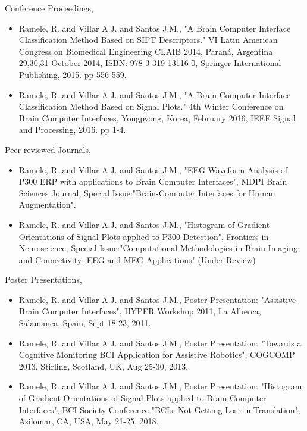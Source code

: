 \documentclass[11pt,twoside,openright]{moddalthesis}
\theoremstyle{definition}
\begin{document}
\begin{listofpubs}

\vspace{-\baselineskip}
\vspace{-\baselineskip}

Conference Proceedings,


\begin{itemize}
\item Ramele, R. and Villar A.J. and Santos J.M., "A Brain Computer Interface Classification Method Based on SIFT Descriptors." VI Latin American Congress on Biomedical Engineering CLAIB 2014, Paraná, Argentina 29,30,31 October 2014,  ISBN: 978-3-319-13116-0, Springer International Publishing, 2015. pp 556-559.
\item Ramele, R. and Villar A.J. and Santos J.M.,  "A Brain Computer Interface Classification Method Based on Signal Plots." 4th Winter Conference on Brain Computer Interfaces, Yongpyong, Korea, February 2016, IEEE Signal and Processing, 2016. pp 1-4.
\end{itemize}

Peer-reviewed Journals,


\begin{itemize}
\item Ramele, R. and Villar A.J. and Santos J.M.,  "EEG Waveform Analysis of P300 ERP with applications to Brain Computer Interfaces", MDPI Brain Sciences Journal, Special Issue:"Brain-Computer Interfaces for Human Augmentation".
\item Ramele, R. and Villar A.J. and Santos J.M., "Histogram of Gradient Orientations of Signal Plots applied to P300 Detection", Frontiers in Neuroscience, Special Issue:"Computational Methodologies in Brain Imaging and Connectivity: EEG and MEG Applications" (Under Review)
\end{itemize}


Poster Presentations,

\begin{itemize}
\item Ramele, R. and Villar A.J. and Santos J.M.,  Poster Presentation: "Assistive Brain Computer Interfaces", HYPER Workshop 2011, La Alberca, Salamanca, Spain, Sept 18-23, 2011.
\item Ramele, R. and Villar A.J. and Santos J.M., Poster Presentation: "Towards a Cognitive Monitoring BCI Application for Assistive Robotics", COGCOMP 2013, Stirling, Scotland, UK, Aug 25-30, 2013.
\item Ramele, R. and Villar A.J. and Santos J.M., Poster Presentation: "Histogram of Gradient Orientations of Signal Plots applied to Brain Computer Interfaces", BCI Society Conference "BCIs: Not Getting Lost in Translation", Asilomar, CA, USA, May 21-25, 2018.
\end{itemize}


\end{listofpubs}
\end{document}

